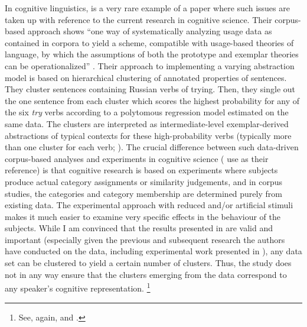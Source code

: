 In cognitive linguistics, \cite{DivjakArppe2013} is a very rare example of a paper where such issues are taken up with reference to the current research in cognitive science.
Their corpus-based approach shows ``one way of systematically analyzing usage data as contained in corpora to yield a scheme, compatible with usage-based theories of language, by which the assumptions of both the prototype and exemplar theories can be operationalized'' \citep[267]{DivjakArppe2013}.
Their approach to implementing a varying abstraction model \citep[254--260]{DivjakArppe2013} is based on hierarchical clustering of annotated properties of sentences.
They cluster sentences containing Russian verbs of trying.
Then, they single out the one sentence from each cluster which scores the highest probability for any of the six \textit{try} verbs according to a polytomous regression model estimated on the same data.
The clusters are interpreted as intermediate-level exemplar-derived abstractions of typical contexts for these high-probability verbs (typically more than one cluster for each verb; \citealp[255--256]{DivjakArppe2013}).
The crucial difference between such data-driven corpus-based analyses and experiments in cognitive science (\citealp{DivjakArppe2013} use \citealp{VerbeemenEa2007} as their reference) is that cognitive research is based on experiments where subjects produce actual category assignments or similarity judgements, and in corpus studies, the categories and category membership are determined purely from existing data.
The experimental approach with reduced and\slash or artificial stimuli makes it much easier to examine very specific effects in the behaviour of the subjects.
While I am convinced that the results presented in \citet{DivjakArppe2013} are valid and important (especially given the previous and subsequent research the authors have conducted on the data, including experimental work presented in \citealp{DivjakEa2016}), any data set can be clustered to yield a certain number of clusters.
Thus, the study does not in any way ensure that the clusters emerging from the data correspond to any speaker's cognitive representation.%
\footnote{See, again, \citet[486--487]{Dabrowska2016} and \citet[22]{Gries2003}.}


